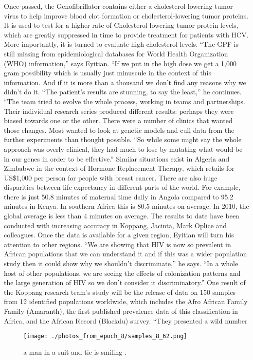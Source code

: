 \documentclass{article}%
\begin{document}
Once passed, the Genofibrillator contains either a cholesterol{-}lowering tumor virus to help improve blood clot formation or cholesterol{-}lowering tumor proteins. It is used to test for a higher rate of Cholesterol{-}lowering tumor protein levels, which are greatly suppressed in time to provide treatment for patients with HCV. More importantly, it is turned to evaluate high cholesterol levels.\newline%
“The GPF is still missing from epidemiological databases for World Health Organization (WHO) information,” says Eyitian. “If we put in the high dose we get a 1,000 gram possibility which is usually just minuscule in the context of this information. And if it is more than a thousand we don't find any reasons why we didn't do it.\newline%
“The patient's results are stunning, to say the least,” he continues. “The team tried to evolve the whole process, working in teams and partnerships. Their individual research series produced different results: perhaps they were biased towards one or the other. There were a number of clinics that wanted those changes. Most wanted to look at genetic models and cull data from the further experiments than thought possible.\newline%
“So while some might say the whole approach was overly clinical, they had much to lose by mutating what would be in our genes in order to be effective.”\newline%
Similar situations exist in Algeria and Zimbabwe in the context of Hormone Replacement Therapy, which retails for US\$1,000 per person for people with breast cancer.\newline%
There are also huge disparities between life expectancy in different parts of the world. For example, there is just 50.8 minutes of maternal time daily in Angola compared to 95.2 minutes in Kenya. In southern Africa this is 80.5 minutes on average. In 2010, the global average is less than 4 minutes on average.\newline%
The results to date have been conducted with increasing accuracy in Koppang, Jacinta, Mark Oplice and colleagues. Once the data is available for a given region, Eyitian will turn his attention to other regions.\newline%
“We are showing that HIV is now so prevalent in African populations that we can understand it and if this was a wider population study then it could show why we shouldn't discriminate,” he says. “In a whole host of other populations, we are seeing the effects of colonization patterns and the large generation of HIV so we don't consider it discriminatory.”\newline%
One result of the Koppang research team’s study will be the release of data on 150 samples from 12 identified populations worldwide, which includes the Afro African Family Family (Amaranth), the first published prevalence data of this classification in Africa, and the African Record (Blackdu) survey.\newline%
“They presented a wild number

%


\begin{figure}[h!]%
\centering%
\texttt{[image: ./photos\_from\_epoch\_8/samples\_8\_62.png]}%
\caption{a man in a suit and tie is smiling .}%
\end{figure}

%
\end{document}
